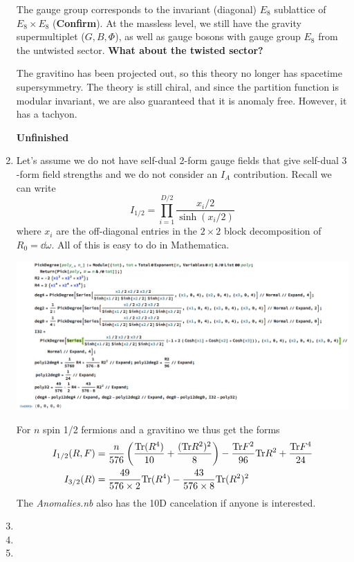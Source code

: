 \documentclass[11pt, class=article, crop=false]{standalone}
\begin{document}
\begin{enumerate}
	The gauge group corresponds to the invariant (diagonal) $E_8$ sublattice of $E_8 \times E_8$ (\textbf{Confirm}). At the massless level, we still have the gravity supermultiplet ($G, B, \Phi$), as well as gauge bosons with gauge group $E_8$ from the untwisted sector. \textbf{What about the twisted sector?}
	
	The gravitino has been projected out, so this theory no longer has spacetime supersymmetry. 
	The theory is still chiral, and since the partition function is modular invariant, we are also guaranteed that it is anomaly free. However, it has a tachyon. 

	\textbf{Unfinished}
	
	\item Let's assume we do not have self-dual 2-form gauge fields that give self-dual $3$-form field strengths and we do not consider an $I_A$ contribution. Recall we can write
	\[
		I_{1/2} = \prod_{i=1}^{D/2} \frac{x_i/2}{\sinh(x_i/2)}
	\]
	where $x_i$ are the off-diagonal entries in the $2\times2$ block decomposition of $R_0 = \dd \omega$. All of this is easy to do in Mathematica. 
	\begin{center}
		\includegraphics[scale=0.45]{"Figures/6D Anomaly"}
	\end{center}
	For $n$ spin 1/2 fermions and a gravitino we thus get the forms
	\[
	\begin{aligned}
		I_{1/2}(R, F) &= \frac{n}{576} \left(\frac{\mathrm{Tr} (R^4)}{10} + \frac{(\mathrm{Tr} R^2)^2}{8} \right) - \frac{\mathrm{Tr} F^2}{96} \mathrm{Tr} R^2 + \frac{\mathrm{Tr} F^4}{24}\\
		I_{3/2}(R) &= \frac{49}{576 \times 2} \mathrm{Tr} (R^4) - \frac{43}{576 \times 8} \mathrm{Tr}(R^2)^2
	\end{aligned}
	\]
	The \emph{Anomalies.nb} also has the 10D cancelation if anyone is interested.
	
	\item 
	
	\item 
	
	\item
	
\end{enumerate}
	
\end{document}

